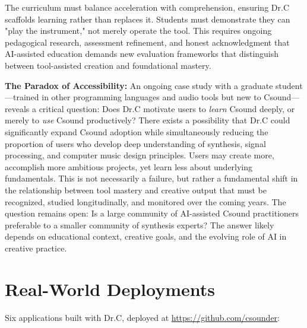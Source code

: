 \documentclass[a4paper]{article}
\begin{document}
The curriculum must balance acceleration with comprehension, ensuring Dr.C scaffolds learning rather than replaces it. Students must demonstrate they can "play the instrument," not merely operate the tool. This requires ongoing pedagogical research, assessment refinement, and honest acknowledgment that AI-assisted education demands new evaluation frameworks that distinguish between tool-assisted creation and foundational mastery.

\textbf{The Paradox of Accessibility:} An ongoing case study with a graduate student—trained in other programming languages and audio tools but new to Csound—reveals a critical question: Does Dr.C motivate users to \textit{learn} Csound deeply, or merely to \textit{use} Csound productively? There exists a possibility that Dr.C could significantly expand Csound adoption while simultaneously reducing the proportion of users who develop deep understanding of synthesis, signal processing, and computer music design principles. Users may create more, accomplish more ambitious projects, yet learn less about underlying fundamentals. This is not necessarily a failure, but rather a fundamental shift in the relationship between tool mastery and creative output that must be recognized, studied longitudinally, and monitored over the coming years. The question remains open: Is a large community of AI-assisted Csound practitioners preferable to a smaller community of synthesis experts? The answer likely depends on educational context, creative goals, and the evolving role of AI in creative practice.

\section{Real-World Deployments}
\label{sec:deployments}

Six applications built with Dr.C, deployed at \url{https://github.com/csounder}:
\end{document}

